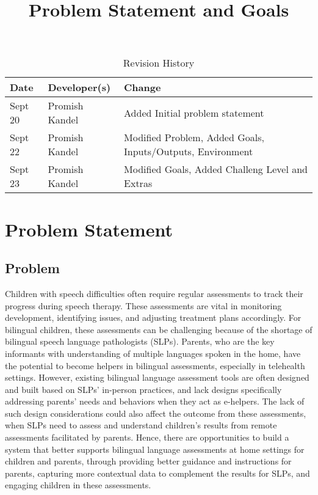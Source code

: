 \documentclass{article}
\title{Problem Statement and Goals\\\progname}
\author{\authname}
\date{}
\begin{document}
\maketitle

\begin{table}[hp]
\caption{Revision History} \label{TblRevisionHistory}
\begin{tabularx}{\textwidth}{llX}
\toprule
\textbf{Date} & \textbf{Developer(s)} & \textbf{Change}\\
\midrule
Sept 20 & Promish Kandel& Added Initial problem statement\\
Sept 22 & Promish Kandel & Modified Problem, Added Goals, Inputs/Outputs, Environment\\
Sept 23 & Promish Kandel & Modified Goals, Added Challeng Level and Extras\\
\bottomrule
\end{tabularx}
\end{table}

\section{Problem Statement}


\subsection{Problem}
\hspace{2em}Children with speech difficulties often require regular assessments to track their progress
during speech therapy. These assessments are vital in monitoring development, identifying issues, and
adjusting treatment plans accordingly. For bilingual children, these assessments can be challenging
because of the shortage of bilingual  speech language pathologists (SLPs).  Parents, who are the key
informants with understanding of multiple languages spoken in the home, have the potential to become
helpers in bilingual assessments, especially in telehealth settings. However, existing bilingual language
assessment tools are often designed and built based on SLPs’ in-person practices, and lack designs
specifically addressing parents’ needs and behaviors when they act as e-helpers. The lack of such design
considerations could also affect the outcome from these assessments, when SLPs need to assess and understand
children’s results from remote assessments facilitated by parents. Hence, there are opportunities to build a
system that better supports bilingual language assessments at home settings for children and parents, through
providing better guidance and instructions for parents, capturing more contextual data to complement the
results for SLPs, and engaging children in these assessments.
\end{document}
